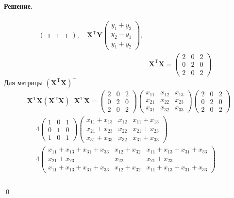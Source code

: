\documentclass[specialist, subf, href, 12pt]{article}
\newenvironment{solution}{\paragraph{Решение.}}{\hfill\\\hfill\qed}
\begin{document}
\begin{solution}
\begin{align*}
\begin{pmatrix}
				1&1&1
			\end{pmatrix},\quad	\bm{X}^\mathrm{T}\bm{Y}\begin{pmatrix}
				y_1+y_2\\
				y_2-y_1\\
				y_1+y_2
			\end{pmatrix},\\
			&\bm{X}^\mathrm{T}\bm{X}=\begin{pmatrix}
				2&0&2\\
				0&2&0\\
				2&0&2
			\end{pmatrix}.
		\end{align*}
		Для матрицы $(\bm{X}^\mathrm{T}\bm{X})^-$
		\begin{align*}
			&\bm{X}^\mathrm{T}\bm{X}(\bm{X}^\mathrm{T}\bm{X})^-\bm{X}^\mathrm{T}\bm{X}=\begin{pmatrix}
				2&0&2\\
				0&2&0\\
				2&0&2
			\end{pmatrix}\begin{pmatrix}
			x_{11}&x_{12}&x_{13}\\
			x_{21}&x_{22}&x_{23}\\
			x_{31}&x_{32}&x_{33}
			\end{pmatrix}\begin{pmatrix}
			2&0&2\\
			0&2&0\\
			2&0&2
			\end{pmatrix}\\
			&=4\begin{pmatrix}
				1&0&1\\
				0&1&0\\
				1&0&1
			\end{pmatrix}
			\begin{pmatrix}
				x_{11}+x_{13}&x_{12}&x_{11}+x_{13}\\
				x_{21}+x_{23}&x_{22}&x_{21}+x_{23}\\
				x_{31}+x_{33}&x_{32}&x_{31}+x_{33}
			\end{pmatrix}\\
			&=4\begin{pmatrix}
				x_{11}+x_{13}+x_{31}+x_{33}&x_{12}+x_{32}&x_{11}+x_{13}+x_{31}+x_{33}\\
				x_{21}+x_{23}&x_{22}&x_{21}+x_{23}\\
				x_{11}+x_{13}+x_{31}+x_{33}&x_{12}+x_{32}&x_{11}+x_{13}+x_{31}+x_{33}	
			\end{pmatrix}\\

\end{align*}
\end{solution}
\end{document}
